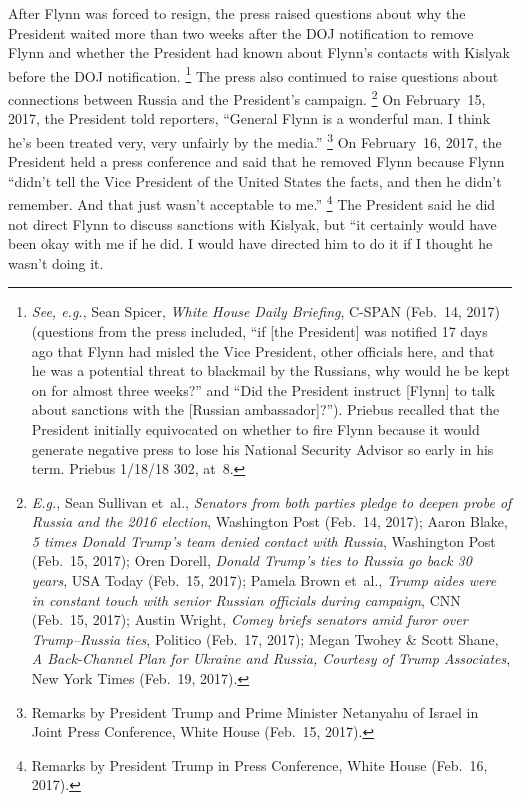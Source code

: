 After Flynn was forced to resign, the press raised questions about why the President waited more than two weeks after the DOJ notification to remove Flynn and whether the President had known about Flynn's contacts with Kislyak before the DOJ notification.%
\footnote{\textit{See, e.g.}, Sean Spicer, \textit{White House Daily Briefing}, C-SPAN (Feb.~14, 2017) (questions from the press included, ``if [the President] was notified 17 days ago that Flynn had misled the Vice President, other officials here, and that he was a potential threat to blackmail by the Russians, why would he be kept on for almost three weeks?'' and ``Did the President instruct [Flynn] to talk about sanctions with the [Russian ambassador]?'').
Priebus recalled that the President initially equivocated on whether to fire Flynn because it would generate negative press to lose his National Security Advisor so early in his term.
Priebus 1/18/18 302, at~8.}
The press also continued to raise questions about connections between Russia and the President's campaign.%
\footnote{\textit{E.g.}, Sean Sullivan et~al., \textit{Senators from both parties pledge to deepen probe of Russia and the 2016 election}, Washington Post (Feb.~14, 2017);
Aaron Blake, \textit{5 times Donald Trump's team denied contact with Russia}, Washington Post (Feb.~15, 2017);
Oren Dorell, \textit{Donald Trump's ties to Russia go back 30 years}, USA Today (Feb.~15, 2017);
Pamela Brown et~al., \textit{Trump aides were in constant touch with senior Russian officials during campaign}, CNN (Feb.~15, 2017);
Austin Wright, \textit{Comey briefs senators amid furor over Trump--Russia ties}, Politico (Feb.~17, 2017);
Megan Twohey \& Scott Shane, \textit{A Back-Channel Plan for Ukraine and Russia, Courtesy of Trump Associates}, New York Times (Feb.~19, 2017).}
On February~15, 2017, the President told reporters, ``General Flynn is a wonderful man.
I think he's been treated very, very unfairly by the media.''%
\footnote{Remarks by President Trump and Prime Minister Netanyahu of Israel in Joint Press Conference, White House (Feb.~15, 2017).}
On February~16, 2017, the President held a press conference and said that he removed Flynn because Flynn ``didn't tell the Vice President of the United States the facts, and then he didn't remember.
And that just wasn't acceptable to me.''%
\footnote{Remarks by President Trump in Press Conference, White House (Feb.~16, 2017).}
The President said he did not direct Flynn to discuss sanctions with Kislyak, but ``it certainly would have been okay with me if he did.
I would have directed him to do it if I thought he wasn't doing it.
